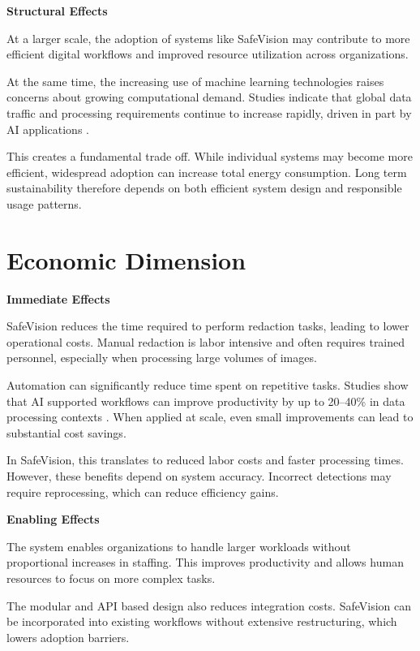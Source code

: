 \noindent\textbf{Structural Effects}

At a larger scale, the adoption of systems like SafeVision may contribute to more efficient digital workflows and improved resource utilization across organizations.

At the same time, the increasing use of machine learning technologies raises concerns about growing computational demand. Studies indicate that global data traffic and processing requirements continue to increase rapidly, driven in part by AI applications \cite{andrae2015global}.

This creates a fundamental trade off. While individual systems may become more efficient, widespread adoption can increase total energy consumption. Long term sustainability therefore depends on both efficient system design and responsible usage patterns.


\section{Economic Dimension}

\noindent\textbf{Immediate Effects}

SafeVision reduces the time required to perform redaction tasks, leading to lower operational costs. Manual redaction is labor intensive and often requires trained personnel, especially when processing large volumes of images.

Automation can significantly reduce time spent on repetitive tasks. Studies show that AI supported workflows can improve productivity by up to 20--40\% in data processing contexts \cite{bessen2019ai}. When applied at scale, even small improvements can lead to substantial cost savings.

In SafeVision, this translates to reduced labor costs and faster processing times. However, these benefits depend on system accuracy. Incorrect detections may require reprocessing, which can reduce efficiency gains.

\noindent\textbf{Enabling Effects}

The system enables organizations to handle larger workloads without proportional increases in staffing. This improves productivity and allows human resources to focus on more complex tasks.

The modular and API based design also reduces integration costs. SafeVision can be incorporated into existing workflows without extensive restructuring, which lowers adoption barriers.

